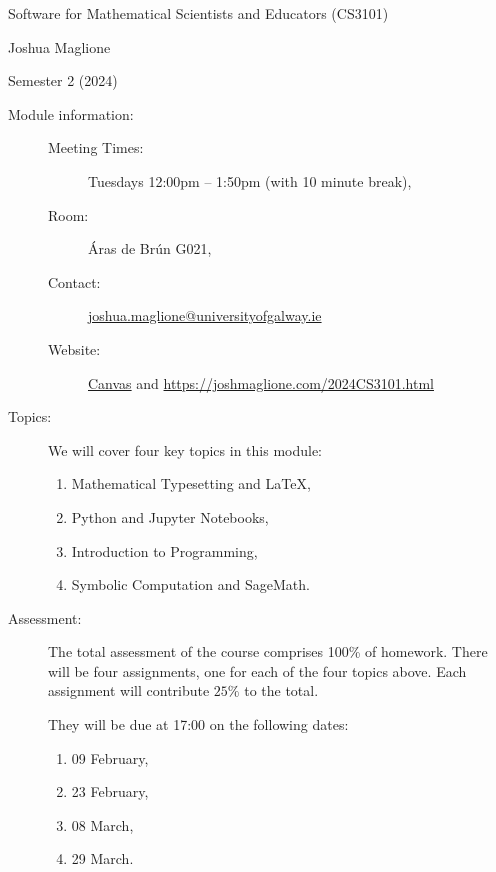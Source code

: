 \documentclass[a4paper, 12pt]{article}
\begin{document}
\pagestyle{empty}

\begin{center}
{\Large Software for Mathematical Scientists and Educators (CS3101)} 

\vspace{0.25cm}

{\large Joshua Maglione}

\vspace{0.25cm}

Semester 2 (2024)
\end{center}

\vspace{0.5cm}

\begin{description}
    \item[Module information:] \hfill
    \begin{description}
      \item[Meeting Times:] Tuesdays 12:00pm -- 1:50pm (with 10 minute break),
      \item[Room:] \'Aras de Br\'un G021,
      \item[Contact:] \url{joshua.maglione@universityofgalway.ie} 
      \item[Website:] \href{https://universityofgalway.instructure.com/}{\textsf{Canvas}} and \url{https://joshmaglione.com/2024CS3101.html} 
    \end{description} 
    \vspace{1cm}
    \item[Topics:] We will cover four key topics in this module:
    \begin{enumerate} 
      \item Mathematical Typesetting and \LaTeX,
      \item Python and Jupyter Notebooks,
      \item Introduction to Programming,
      \item Symbolic Computation and SageMath.
    \end{enumerate}
    
    \vspace{1cm}
    \item[Assessment:] The total assessment of the course comprises 100\% of
    homework. There will be four assignments, one for each of the four topics
    above. Each assignment will contribute $25\%$ to the total. 

    They will be due at 17:00 on the following dates:
    \begin{enumerate}
      \item 09 February, 
      \item 23 February,
      \item 08 March,
      \item 29 March.
    \end{enumerate}
\end{description}
\end{document}
